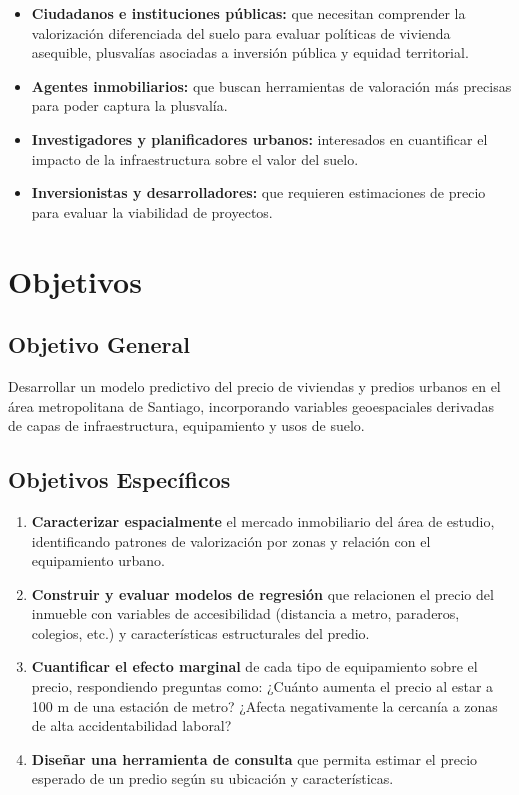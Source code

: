 \documentclass[12pt, letterpaper]{article}
\begin{document}
\begin{itemize}[leftmargin=1.5em, itemsep=0.3em]
  \item \textbf{Ciudadanos e instituciones públicas:} que necesitan comprender
        la valorización diferenciada del suelo para evaluar políticas de vivienda
        asequible, plusvalías asociadas a inversión pública y equidad territorial.
  \item \textbf{Agentes inmobiliarios:} que buscan herramientas de
        valoración más precisas para poder captura la plusvalía.
  \item \textbf{Investigadores y planificadores urbanos:} interesados en cuantificar
        el impacto de la infraestructura sobre el valor del suelo.
  \item \textbf{Inversionistas y desarrolladores:} que requieren estimaciones de
        precio para evaluar la viabilidad de proyectos.
\end{itemize}

\section{Objetivos}

\subsection{Objetivo General}

Desarrollar un modelo predictivo del precio de viviendas y predios urbanos en
el área metropolitana de Santiago, incorporando variables geoespaciales derivadas
de capas de infraestructura, equipamiento y usos de suelo.

\subsection{Objetivos Específicos}

\begin{enumerate}[leftmargin=1.5em, itemsep=0.4em]
  \item \textbf{Caracterizar espacialmente} el mercado inmobiliario del área
        de estudio, identificando patrones de valorización por zonas y relación
        con el equipamiento urbano.
  \item \textbf{Construir y evaluar modelos de regresión} que relacionen el precio
        del inmueble con variables de accesibilidad (distancia a metro, paraderos,
        colegios, etc.) y características estructurales del predio.
  \item \textbf{Cuantificar el efecto marginal} de cada tipo de equipamiento
        sobre el precio, respondiendo preguntas como: ¿Cuánto aumenta el precio
        al estar a 100 m de una estación de metro? ¿Afecta negativamente la
        cercanía a zonas de alta accidentabilidad laboral?
  \item \textbf{Diseñar una herramienta de consulta} que permita estimar el
        precio esperado de un predio según su ubicación y características.
\end{enumerate}
\end{document}
